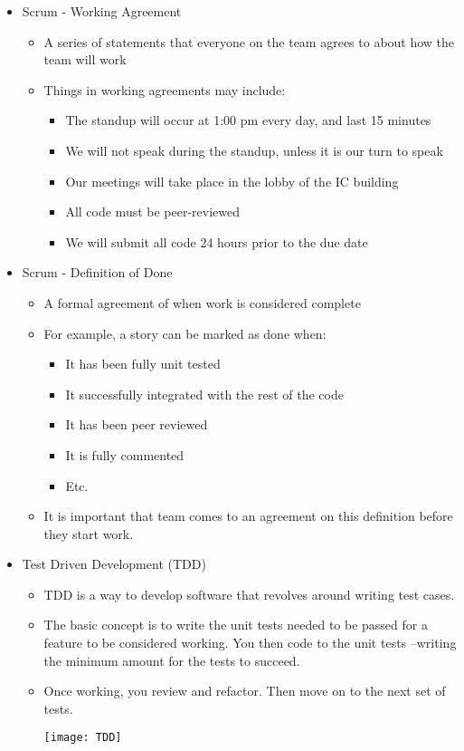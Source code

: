\documentclass[11pt]{article}
\begin{document}
\begin{itemize}
		\item Scrum - Working Agreement
			\begin{itemize}
				\item A series of statements that everyone on the team agrees to about how the team will work
				\item Things in working agreements may include:
					\begin{itemize}
						\item The standup will occur at 1:00 pm every day, and last 15 minutes
						\item We will not speak during the standup, unless it is our turn to speak
						\item Our meetings will take place in the lobby of the IC building
						\item All code must be peer-reviewed
						\item We will submit all code 24 hours prior to the due date
					\end{itemize}
			\end{itemize}

		\item Scrum - Definition of Done
			\begin{itemize}
				\item A formal agreement of when work is considered complete
				\item For example, a story can be marked as done when:
					\begin{itemize}
						\item It has been fully unit tested
						\item It successfully integrated with the rest of the code
						\item It has been peer reviewed
						\item It is fully commented
						\item Etc.
					\end{itemize}
				\item It is important that team comes to an agreement on this definition before they start work.
			\end{itemize}

		\item Test Driven Development (TDD)
			\begin{itemize}
				\item TDD is a way to develop software that revolves around writing test cases.
				\item The basic concept is to write the unit tests needed to be passed for a feature to be considered working. You then code to the unit tests –writing the minimum amount for the tests to succeed.
				\item Once working, you review and refactor. Then move on to the next set of tests.\\[-15pt]
				\begin{center}
					\texttt{[image: TDD]}
				\end{center}
			\end{itemize}


\end{itemize}
\end{document}
